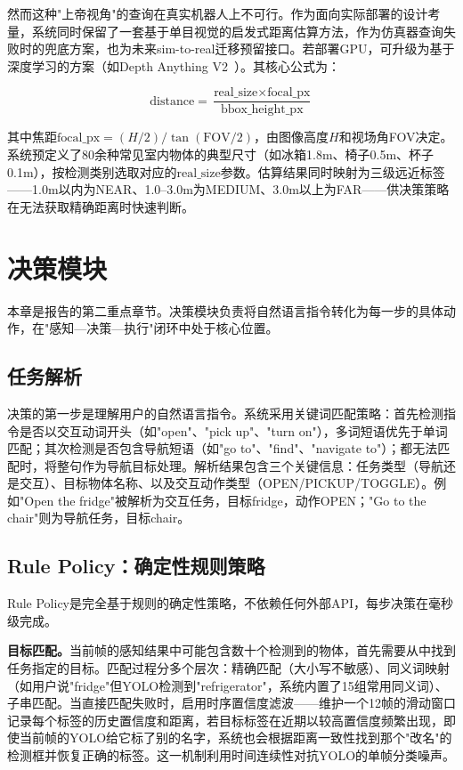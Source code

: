\documentclass{SYSUReport}
\begin{document}
然而这种"上帝视角"的查询在真实机器人上不可行。作为面向实际部署的设计考量，系统同时保留了一套基于单目视觉的启发式距离估算方法，作为仿真器查询失败时的兜底方案，也为未来sim-to-real迁移预留接口。若部署GPU，可升级为基于深度学习的方案（如Depth Anything V2~\cite{yang2024depthanythingv2}）。其核心公式为：

\begin{equation}
  \text{distance} = \frac{\text{real\_size} \times \text{focal\_px}}{\text{bbox\_height\_px}}
  \label{eq:pinhole}
\end{equation}

其中焦距$\text{focal\_px} = (H/2) / \tan(\text{FOV}/2)$，由图像高度$H$和视场角FOV决定。系统预定义了80余种常见室内物体的典型尺寸（如冰箱1.8m、椅子0.5m、杯子0.1m），按检测类别选取对应的$\text{real\_size}$参数。估算结果同时映射为三级远近标签——1.0m以内为NEAR、1.0--3.0m为MEDIUM、3.0m以上为FAR——供决策策略在无法获取精确距离时快速判断。


\section{决策模块}

本章是报告的第二重点章节。决策模块负责将自然语言指令转化为每一步的具体动作，在"感知—决策—执行"闭环中处于核心位置。

\subsection{任务解析}

决策的第一步是理解用户的自然语言指令。系统采用关键词匹配策略：首先检测指令是否以交互动词开头（如"open"、"pick up"、"turn on"），多词短语优先于单词匹配；其次检测是否包含导航短语（如"go to"、"find"、"navigate to"）；都无法匹配时，将整句作为导航目标处理。解析结果包含三个关键信息：任务类型（导航还是交互）、目标物体名称、以及交互动作类型（OPEN/PICKUP/TOGGLE）。例如"Open the fridge"被解析为交互任务，目标fridge，动作OPEN；"Go to the chair"则为导航任务，目标chair。

\subsection{Rule Policy：确定性规则策略}

Rule Policy是完全基于规则的确定性策略，不依赖任何外部API，每步决策在毫秒级完成。

\textbf{目标匹配。}当前帧的感知结果中可能包含数十个检测到的物体，首先需要从中找到任务指定的目标。匹配过程分多个层次：精确匹配（大小写不敏感）、同义词映射（如用户说"fridge"但YOLO检测到"refrigerator"，系统内置了15组常用同义词）、子串匹配。当直接匹配失败时，启用时序置信度滤波——维护一个12帧的滑动窗口记录每个标签的历史置信度和距离，若目标标签在近期以较高置信度频繁出现，即使当前帧的YOLO给它标了别的名字，系统也会根据距离一致性找到那个"改名"的检测框并恢复正确的标签。这一机制利用时间连续性对抗YOLO的单帧分类噪声。
\end{document}
